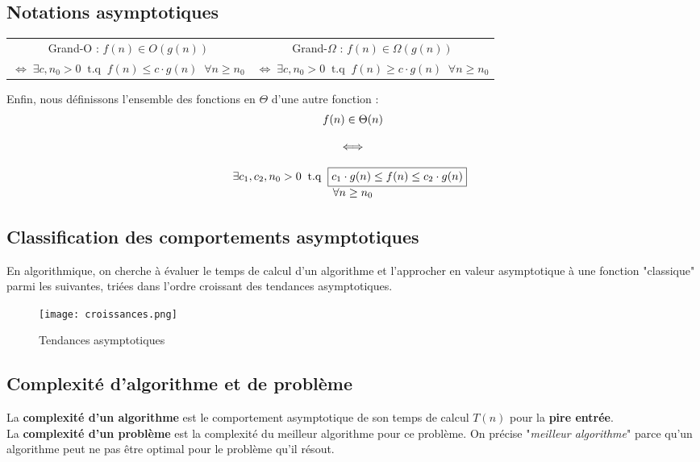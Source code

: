 \documentclass[12pt,a4paper]{book}
\begin{document}
\subsection{Notations asymptotiques}
\begin{table}[h]
\begin{tabular}{c|c}
Grand-O : $f(n) \in O\left(g(n)\right)$ & Grand-$\Omega$ : $f(n) \in \Omega\left(g(n)\right)$\\
$ \Leftrightarrow \;\exists c, n_0 >0 \;\; \mathrm{t.q} \;\; \boxed{f(n) \leq c\cdot g(n)}\;\; \forall n\geq n_0$ & $ \Leftrightarrow \;\exists c, n_0 >0 \;\; \mathrm{t.q} \;\; \boxed{f(n) \geq c\cdot g(n)}\;\; \forall n\geq n_0$
\end{tabular}
\end{table}
Enfin, nous définissons l'ensemble des fonctions en $\Theta$ d'une autre fonction :
$$\begin{array}{c}
f(n) \in \Theta(n) \\
\strut \\
\iff \\
\strut \\
\exists c_1, c_2, n_0 >0 \;\; \mathrm{t.q} \;\; \boxed{c_1 \cdot g(n) \leq f(n) \leq c_2\cdot g(n)}\;\; \\ \forall n\geq n_0
\end{array}$$

\subsection{Classification des comportements asymptotiques}
En algorithmique, on cherche à évaluer le temps de calcul d'un algorithme et l'approcher en valeur asymptotique à une fonction "classique" parmi les suivantes, triées dans l'ordre croissant des tendances asymptotiques.
\begin{figure}[h]
\centering
\texttt{[image: croissances.png]}
\caption{Tendances asymptotiques}
\end{figure}
\subsection{Complexité d'algorithme et de problème}
La \textbf{complexité d'un algorithme} est le comportement asymptotique de son temps de calcul $T(n)$ pour la \textbf{pire entrée}.\\

La \textbf{complexité d'un problème} est la complexité du meilleur algorithme pour ce problème. On précise "\textit{meilleur algorithme}" parce qu'un algorithme peut ne pas être optimal pour le problème qu'il résout.
\end{document}
